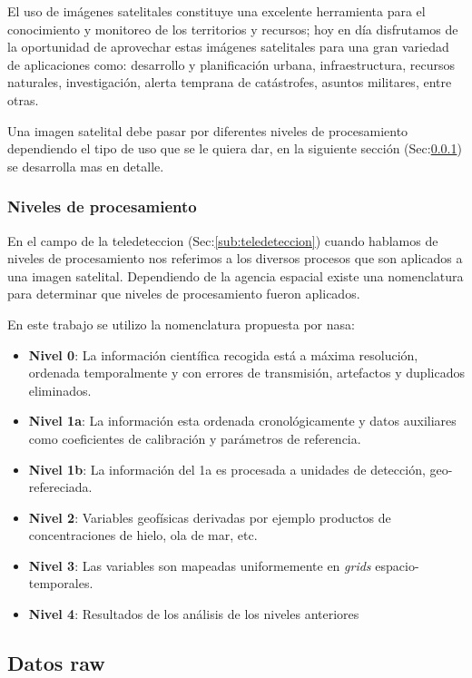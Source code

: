 El uso de imágenes satelitales constituye una excelente herramienta para el conocimiento y monitoreo de los territorios y recursos; hoy en día disfrutamos de la oportunidad de aprovechar estas imágenes satelitales para una gran variedad de aplicaciones como: desarrollo y planificación urbana, infraestructura, recursos naturales, investigación, alerta temprana de catástrofes, asuntos militares, entre otras.

Una imagen satelital debe pasar por diferentes niveles de procesamiento dependiendo el tipo de uso que se le quiera dar, en la siguiente sección (Sec:\ref{sub:nivelesdeprocesamiento}) se desarrolla mas en detalle.

\subsubsection{Niveles de procesamiento}\label{sub:nivelesdeprocesamiento}

En el campo de la teledeteccion (Sec:\ref{sub:teledeteccion}) cuando hablamos de niveles de procesamiento nos referimos a los diversos procesos que son aplicados a una imagen satelital. Dependiendo de la agencia espacial existe una nomenclatura para determinar que niveles de procesamiento fueron aplicados.

En este trabajo se utilizo la nomenclatura propuesta por \ac{nasa}:
\begin{itemize}
	\item \textbf{Nivel 0}: La información científica recogida está a máxima resolución, ordenada temporalmente y con errores de transmisión, artefactos y duplicados eliminados.
 	\item \textbf{Nivel 1a}: La información esta ordenada cronológicamente y datos auxiliares como coeficientes de calibración y parámetros de referencia.
 	\item \textbf{Nivel 1b}: La información del 1a es procesada a unidades de detección, geo-refereciada.
 	\item \textbf{Nivel 2}: Variables geofísicas derivadas por ejemplo productos de concentraciones de hielo, ola de mar, etc.
 	\item \textbf{Nivel 3}: Las variables son mapeadas uniformemente en \textit{grids} espacio-temporales.
 	\item \textbf{Nivel 4}: Resultados de los análisis de los niveles anteriores
\end{itemize}


\subsection{Datos raw}\label{sec:datosutilizados}

